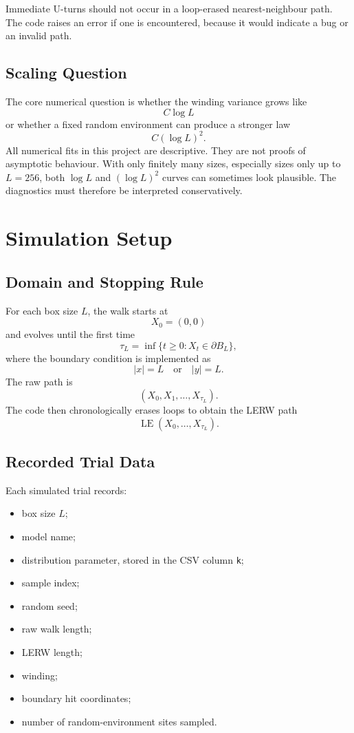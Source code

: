 \documentclass[11pt]{article}
\begin{document}
Immediate U-turns should not occur in a loop-erased nearest-neighbour path. The
code raises an error if one is encountered, because it would indicate a bug or
an invalid path.

\subsection{Scaling Question}

The core numerical question is whether the winding variance grows like
\[
  C \log L
\]
or whether a fixed random environment can produce a stronger law
\[
  C(\log L)^2.
\]
All numerical fits in this project are descriptive. They are not proofs of
asymptotic behaviour. With only finitely many sizes, especially sizes only up
to $L=256$, both $\log L$ and $(\log L)^2$ curves can sometimes look plausible.
The diagnostics must therefore be interpreted conservatively.

\section{Simulation Setup}

\subsection{Domain and Stopping Rule}

For each box size $L$, the walk starts at
\[
  X_0=(0,0)
\]
and evolves until the first time
\[
  \tau_L = \inf\{t \geq 0 : X_t \in \partial B_L\},
\]
where the boundary condition is implemented as
\[
  |x|=L \quad \text{or} \quad |y|=L.
\]
The raw path is
\[
  (X_0,X_1,\ldots,X_{\tau_L}).
\]
The code then chronologically erases loops to obtain the LERW path
\[
  \operatorname{LE}(X_0,\ldots,X_{\tau_L}).
\]

\subsection{Recorded Trial Data}

Each simulated trial records:
\begin{itemize}
  \item box size $L$;
  \item model name;
  \item distribution parameter, stored in the CSV column \texttt{k};
  \item sample index;
  \item random seed;
  \item raw walk length;
  \item LERW length;
  \item winding;
  \item boundary hit coordinates;
  \item number of random-environment sites sampled.
\end{itemize}
\end{document}

